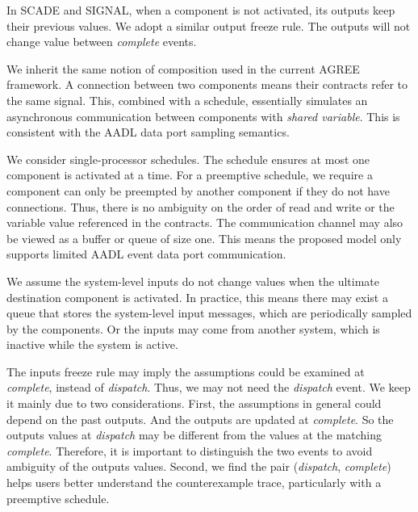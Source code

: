In SCADE and SIGNAL, when a component is not activated, its outputs keep their previous values. We adopt a similar output freeze rule. The outputs will not change value between \emph{complete} events. 

We inherit the same notion of composition used in the current AGREE framework. A connection between two components means their contracts refer to the same signal. 
This, combined with a schedule, essentially simulates an asynchronous communication between components with \emph{shared variable}. This is consistent with the AADL data port sampling semantics. 

We consider single-processor schedules. The schedule ensures at most one component is activated at a time. For a preemptive schedule, we require a component can only be preempted by another component if they do not have connections. Thus, there is no ambiguity on the order of read and write or the variable value referenced in the contracts.
The communication channel may also be viewed as a buffer or queue of size one. %
This means the proposed model only supports limited AADL event data port communication.
 
We assume the system-level inputs do not change values when the ultimate destination component is activated. In practice, this means there may exist a queue that stores the system-level input messages, which are periodically sampled by the components. Or the inputs may come from another system, which is inactive while the system is active.

The inputs freeze rule may imply the assumptions could be examined at \emph{complete}, instead of \emph{dispatch}. Thus, we may not need the \emph{dispatch} event. We keep it mainly due to two considerations. First, the assumptions in general could depend on the past outputs. And the outputs are updated at \emph{complete}. So the outputs values at \emph{dispatch} may be different from the values at the matching \emph{complete}. Therefore, it is important to distinguish the two events to avoid ambiguity of the outputs values. Second, we find the pair (\emph{dispatch}, \emph{complete}) helps users better understand the counterexample trace, particularly with a preemptive schedule.

